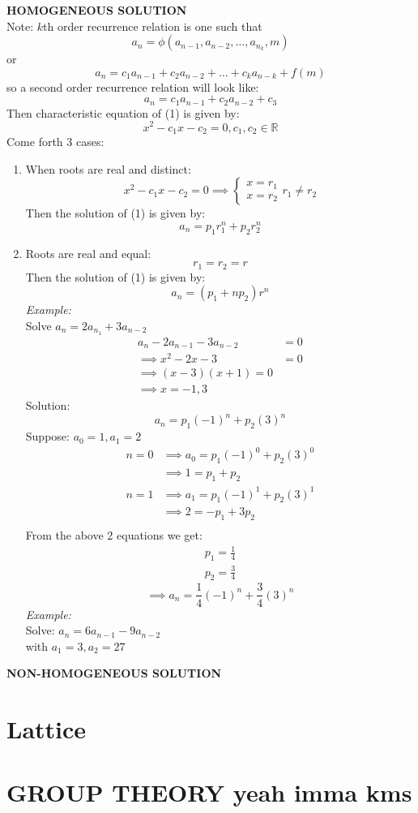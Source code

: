 \documentclass[11pt,letterpaper]{article}
\newenvironment{example}                             
        {\textit{Example:}\\}
	{}
\begin{document}
\textbf{HOMOGENEOUS SOLUTION}\\
Note: $k$th order recurrence relation is one such that\[
  a_n = \phi(a_{n-1},a_{n-2},\dots,a_{n_k},m)
\]
or 
\[
  a_n = c_1a_{n-1} + c_2a_{n-2} + \dots + c_ka_{n-k} +  f(m)
\]
so a second order recurrence relation will look like:
\begin{equation}
  a_n = c_1a_{n-1} + c_2a_{n-2} + c_3
\end{equation}
Then characteristic equation of (1) is given by:
\[
  x^2 - c_1x - c_2 = 0, c_1,c_2 \in \mathbb{R}
\]
Come forth 3 cases: 
\begin{enumerate}
  \item When roots are real and distinct: \\
    \[
      x^2 - c_1x-c_2 = 0 \implies\begin{cases}
        x = r_1 \\ 
        x = r_2
      \end{cases}
      r_1 \neq r_2
    \]
    Then the solution of (1) is given by:
    \[
      a_n = p_1r_1^n + p_2 r_2^n
    \]
  \item Roots are real and equal:
    \[
      r_1 = r_2 = r
    \]
    Then the solution of (1) is given by:
    \[
      a_n = (p_1 + np_2) r^n
    \]
    \begin{example}
      Solve $a_n = 2a_{n_1} + 3a_{n-2}$
      \begin{align*}
        a_n - 2a_{n-1} - 3a_{n-2} &= 0\\
        \implies x^2 - 2x - 3 &= 0\\
        \implies (x-3)(x+1) = 0\\ 
        \implies x = -1, 3
      \end{align*}
      Solution: 
      \[
        a_n = p_1(-1)^n + p_2(3)^n
      \]
      Suppose: $a_0 = 1, a_1 = 2$
      \begin{align*}
        n = 0 &\implies a_0 = p_1(-1)^0 + p_2(3)^0\\
              &\implies 1 = p_1 + p_2\\
        n = 1 &\implies a_1 = p_1(-1)^1 + p_2(3)^1\\
              &\implies 2 = -p_1 + 3p_2\\
      \end{align*}
      From the above 2 equations we get:
      \begin{align*}
        p_1 = \frac{1}{4}\\
        p_2 = \frac{3}{4}
      \end{align*}
      \[
        \implies a_n = \frac{1}{4} (-1)^n + \frac{3}{4} (3)^n
      \]
    \end{example}
    \begin{example}
      Solve: $a_n = 6a_{n-1} - 9a_{n-2}$\\
      with $a_1 = 3, a_2 = 27$
    \end{example}
\end{enumerate}

\textbf{NON-HOMOGENEOUS SOLUTION}
\section{Lattice}
\section{GROUP THEORY yeah imma kms}
\end{document}
